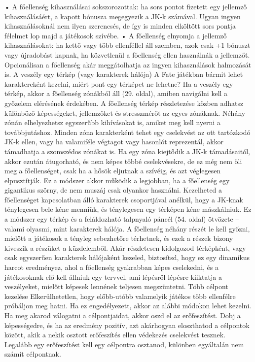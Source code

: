 \documentclass[oneside]{book}
\begin{document}
    • A főellenség kihasználásai sokszorozottak: ha sors pontot fizetett egy jellemző kihasználásáért, a kapott bónusza megegyezik a JK‑k számával. Ugyan ingyen kihasználásoknál nem ilyen szerencsés, de így is minden elköltött sors pontja félelmet lop majd a játékosok szívébe.
    • A főellenség elnyomja a jellemző kihasználásokat: ha kettő vagy több ellenféllel áll szemben, azok csak +1 bónuszt vagy újradobást kapnak, ha közvetlenül a főellenség ellen használnák a jellemzőt. Opcionálisan a főellenség akár meggátolhatja az ingyen kihasználások halmozását is.
A veszély egy térkép (vagy karakterek hálója)
A Fate játékban bármit lehet karaktereként kezelni, miért pont egy térképet ne lehetne? Ha a veszély egy térkép, akkor a főellenség zónákból áll (29. oldal), amiben navigálni kell a győzelem elérésének érdekében.
A főellenség térkép részletezése közben adhatsz különböző képességeket, jellemzőket és stresszmérőt az egyes zónáknak. Néhány zónán elhelyezhetsz egyszerűbb kihívásokat is, amiket meg kell nyerni a továbbjutáshoz. Minden zóna karakterként tehet egy cselekvést az ott tartózkodó JK‑k ellen, vagy ha valamiféle végtagot vagy hasonlót reprezentál, akkor támadhatja a szomszédos zónákat is. Ha egy zóna kiejtődik a JK‑k támadásaitól, akkor ezután átugorható, és nem képes többé cselekvésekre, de ez még nem öli meg a főellenséget, csak ha a hősök eljutnak a szívéig, és azt véglegesen elpusztítják.
Ez a módszer akkor működik a legjobban, ha a főellenség egy gigantikus szörny, de nem muszáj csak olyankor használni. Kezelheted a főellenséget kapcsolatban álló karakterek csoportjával anélkül, hogy a JK‑knak ténylegesen bele kéne menniük, és ténylegesen egy térképen kéne mászkálniuk. Ez a módszer egy térkép és a feláldozható talpnyaló páncél (54. oldal) ötvözete – valami olyasmi, mint karakterek hálója. A főellenség néhány részét le kell győzni, mielőtt a játékosok a tényleg sebezhetőre térhetnek, és ezek a részek bizony kiveszik a részüket a küzdelemből.
Akár részletesen kidolgozod térképként, vagy csak egyszerűen karakterek hálójaként kezeled, biztosítsd, hogy ez egy dinamikus harcot eredményez, ahol a főellenség gyakrabban képes cselekedni, és a játékosoknak elő kell állniuk egy tervvel, ami lépésről lépésre kiiktatja a veszélyeket, mielőtt képesek lennének teljesen megszüntetni.
Több célpont kezelése
Elkerülhetetlen, hogy előbb‑utóbb valamelyik játékos több ellenfélre próbáljon meg hatni. Ha ez engedélyezett, akkor az alábbi módokon lehet kezelni.
Ha meg akarod válogatni a célpontjaidat, akkor oszd el az erőfeszítést. Dobj a képességedre, és ha az eredmény pozitív, azt akárhogyan eloszthatod a célpontok között, akik a nekik osztott erőfeszítés ellen védekezés cselekvést tesznek. Legalább egy erőfeszítést kell egy célpontra osztanod, különben egyáltalán nem számít célpontnak.
\end{document}
